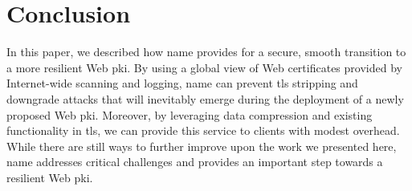 \section{Conclusion}
\label{sec:conclusion}

In this paper, we described how \ac{name} provides for a secure, smooth
transition to a more resilient Web \ac{pki}. By using a global view of Web
certificates provided by Internet-wide scanning and logging, \ac{name} can
prevent \ac{tls} stripping and downgrade attacks that will inevitably emerge 
during the deployment of a newly proposed Web \ac{pki}. Moreover, by leveraging
data compression and existing functionality in \ac{tls}, we can provide this
service to clients with modest overhead. While there are still ways to further
improve upon the work we presented here, \ac{name} addresses critical
challenges and provides an important step towards a resilient Web \ac{pki}. 
